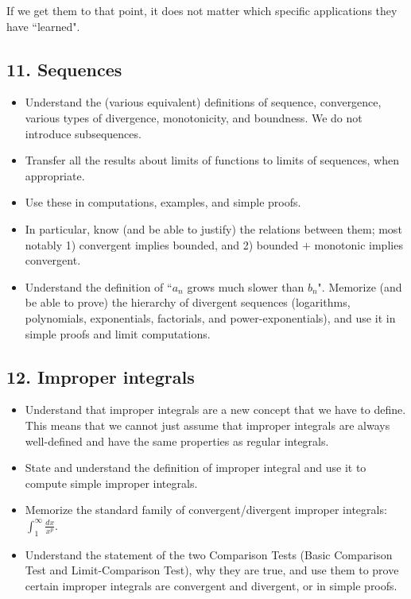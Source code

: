 \documentclass[11pt]{article}
\newcommand {\DS} [1] {${\displaystyle #1}$}
\begin{document}
If we get them to that point, it does not matter which specific applications they have ``learned".


\subsection{11. Sequences} \label{unit11}

	\begin{itemize}
		\item Understand the (various equivalent) definitions of sequence, convergence, various types of divergence, monotonicity, and boundness.   We do not introduce subsequences.
		\item Transfer all the results about limits of functions to limits of sequences, when appropriate.
		\item Use these in computations, examples, and simple proofs.
		\item In particular, know (and be able to justify) the relations between them; most notably 1) convergent implies bounded, and 2) bounded $+$ monotonic implies convergent.
		\item Understand the definition of ``$a_n$ grows much slower than $b_n$". Memorize (and be able to prove) the hierarchy of divergent sequences (logarithms, polynomials, exponentials, factorials, and power-exponentials), and use it in simple proofs and limit computations.
	\end{itemize}

\subsection{12. Improper integrals} \label{unit12}

	\begin{itemize}	
		\item Understand that improper integrals are a new concept that we have to define.  This means that we cannot just assume that improper integrals are always well-defined and have the same properties as regular integrals.
		
		\item State and understand the definition of improper integral and use it to compute simple improper integrals.
		
		\item Memorize the standard family of convergent/divergent improper integrals: \DS{\int^{\infty}_1 \frac{dx}{x^p}}.

		\item Understand the statement of the two Comparison Tests (Basic Comparison Test and Limit-Comparison Test), why they are true, and use them to prove certain improper integrals are convergent and divergent, or in simple proofs.	
	\end{itemize}
	
\end{document}
